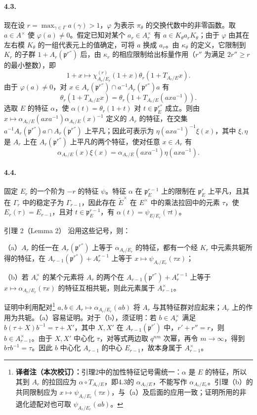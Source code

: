 \paragraph*{4.3.}现在设 $r=\max_{\gamma\in\Gamma}a(\gamma)>1$，$\varphi$ 为表示 $\pi_\theta$ 的交换代数中的非零函数。取 $a\in A^\times$ 使 $\varphi(a)\ne0$。假定已知对某个 $a_r\in A_r^\times$ 有 $a\in K_\theta a_rK_\theta$；由于 $\varphi$ 由其在左右模 $K_\theta$ 的一组代表元上的值确定，可将 $a$ 换成 $a_r$。由 $\kappa_\theta$ 的定义，它限制到 $K_r$ 的子群 $1+A_r(\mathfrak p^{r''})$ 后，由 $\kappa_r$ 的相应限制给出标量作用（$r''$ 为满足 $2r''\geq r$ 的最小整数），即
\[
1+x\longmapsto\chi_{A_r/E_r}^{(r)}(1+x)\theta_r(1+T_{A_r/E}x).
\]
由于 $\varphi(a)\ne0$，对 $x\in A_r(\mathfrak p^{r''})\cap a^{-1}A_r(\mathfrak p^{r''})a$ 有
\[
\theta_r(1+T_{A_r/E}x)=\theta_r(1+T_{A_r/E}(axa^{-1})).
\]
选取 $E$ 的特征 $\alpha$，使 $\alpha(t)=\theta_r(1+t)$ 对 $t\in\mathfrak p_E^{r''}$ 成立。则由 $x\mapsto\alpha_{A_r/E}(axa^{-1})\alpha_{A_r/E}(x)^{-1}$ 定义的 $A_r$ 的特征，在交集 $a^{-1}A_r(\mathfrak p^{r''})a\cap A_r(\mathfrak p^{r''})$ 上平凡；因此可表示为 $\eta(axa^{-1})^{-1}\xi(x)$，其中 $\xi,\eta$ 是 $A_r$ 上在 $A_r(\mathfrak p^{r''})$ 上平凡的两个特征，使对任意 $x\in A_r$ 有
\[
\alpha_{A_r/E}(x)\xi(x)=\alpha_{A_r/E}(axa^{-1})\eta(axa^{-1}).
\]
\paragraph*{4.4.}固定 $E_r$ 的一个阶为 $-r$ 的特征 $\psi$。特征 $\alpha$ 在 $\mathfrak p_E^{r-1}$ 上的限制在 $\mathfrak p_E^r$ 上平凡，且其在 $\Gamma_r$ 中的稳定子为 $\Gamma_{r-1}$，因此存在 $\widetilde E^\times$ 在 $E^\times$ 中的乘法拉回中的元素 $\tau$，使 $E_r(\tau)=E_{r-1}$，且对 $t\in\mathfrak p_E^{r-1}$，有 $\alpha(t)=\psi_{E/E_r}(\tau t)$。
\begin{originaltheorem}{引理 2（Lemma 2）}
沿用这些记号，则：

（a）$A_r$ 的任一在 $A_r(\mathfrak p^{r''})$ 上等于 $\alpha_{A_r/E_r}$ 的特征，都有一个经 $K_r$ 中元素共轭所得的特征，在 $A_{r-1}(\mathfrak p^{r''})+A_r^{r-1}$ 上等于 $x\mapsto\psi_{A_r/E_r}(\tau x)$；

（b）若 $A_r^\times$ 的某个元素将 $A_r$ 的两个在 $A_{r-1}(\mathfrak p^{r''})+A_r^{r-1}$ 上等于 $x\mapsto\alpha_{A_r/E_r}(\tau x)$ 的特征互相共轭，则此元素属于 $A_{r-1}^\times$。
\end{originaltheorem}
证明中利用配对\footnote{\textbf{译者注（本次校订）：}引理2中的加性特征记号需统一：$\alpha$ 是 $E$ 的特征，所以其到 $A_r$ 的拉回应为 $\alpha\circ T_{A_r/E}$，即4.3的 $\alpha_{A_r/E}$，不能写作 $\alpha_{A_r/E_r}$。引理（b）的共同限制应为 $x\mapsto\psi_{A_r/E_r}(\tau x)$，与（a）及后面的应用一致；证明所用的非退化迹配对也可取 $\psi_{A_r/E_r}(ab)$。} $a,b\in A_r\mapsto\alpha_{A_r/E_r}(ab)$ 将 $A_r$ 与其特征群对应起来；$A_r$ 上的作用为共轭。（a）容易证明。对于（b），须证明：若 $b\in A_r^\times$ 满足 $b(\tau+X)b^{-1}=\tau+X'$，其中 $X,X'$ 在 $A_{r-1}(\mathfrak p^{r'})$ 中，$r'+r''=r$，则 $b\in A_{r-1}^\times$。由于 $X,X'$ 中心化 $\tau$，对等式两边取 $q^{nm}$ 次幂，再令 $m\to\infty$，得到 $b\tau b^{-1}=\tau$。因此 $b$ 中心化 $A_{r-1}$ 的中心 $E_{r-1}$，故本身属于 $A_{r-1}^\times$。

